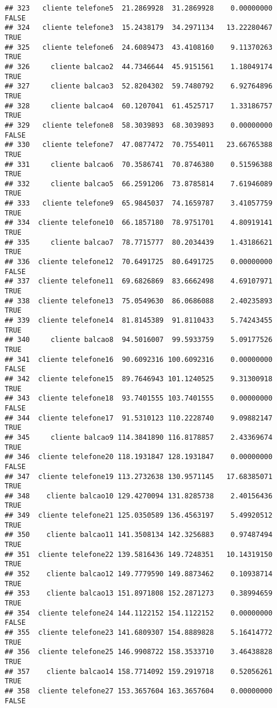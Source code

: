\documentclass[
]{article}
\begin{document}
\begin{verbatim}
## 323   cliente telefone5  21.2869928  31.2869928    0.00000000    FALSE
## 324   cliente telefone3  15.2438179  34.2971134   13.22280467     TRUE
## 325   cliente telefone6  24.6089473  43.4108160    9.11370263     TRUE
## 326     cliente balcao2  44.7346644  45.9151561    1.18049174     TRUE
## 327     cliente balcao3  52.8204302  59.7480792    6.92764896     TRUE
## 328     cliente balcao4  60.1207041  61.4525717    1.33186757     TRUE
## 329   cliente telefone8  58.3039893  68.3039893    0.00000000    FALSE
## 330   cliente telefone7  47.0877472  70.7554011   23.66765388     TRUE
## 331     cliente balcao6  70.3586741  70.8746380    0.51596388     TRUE
## 332     cliente balcao5  66.2591206  73.8785814    7.61946089     TRUE
## 333   cliente telefone9  65.9845037  74.1659787    3.41057759     TRUE
## 334  cliente telefone10  66.1857180  78.9751701    4.80919141     TRUE
## 335     cliente balcao7  78.7715777  80.2034439    1.43186621     TRUE
## 336  cliente telefone12  70.6491725  80.6491725    0.00000000    FALSE
## 337  cliente telefone11  69.6826869  83.6662498    4.69107971     TRUE
## 338  cliente telefone13  75.0549630  86.0686088    2.40235893     TRUE
## 339  cliente telefone14  81.8145389  91.8110433    5.74243455     TRUE
## 340     cliente balcao8  94.5016007  99.5933759    5.09177526     TRUE
## 341  cliente telefone16  90.6092316 100.6092316    0.00000000    FALSE
## 342  cliente telefone15  89.7646943 101.1240525    9.31300918     TRUE
## 343  cliente telefone18  93.7401555 103.7401555    0.00000000    FALSE
## 344  cliente telefone17  91.5310123 110.2228740    9.09882147     TRUE
## 345     cliente balcao9 114.3841890 116.8178857    2.43369674     TRUE
## 346  cliente telefone20 118.1931847 128.1931847    0.00000000    FALSE
## 347  cliente telefone19 113.2732638 130.9571145   17.68385071     TRUE
## 348    cliente balcao10 129.4270094 131.8285738    2.40156436     TRUE
## 349  cliente telefone21 125.0350589 136.4563197    5.49920512     TRUE
## 350    cliente balcao11 141.3508134 142.3256883    0.97487494     TRUE
## 351  cliente telefone22 139.5816436 149.7248351   10.14319150     TRUE
## 352    cliente balcao12 149.7779590 149.8873462    0.10938714     TRUE
## 353    cliente balcao13 151.8971808 152.2871273    0.38994659     TRUE
## 354  cliente telefone24 144.1122152 154.1122152    0.00000000    FALSE
## 355  cliente telefone23 141.6809307 154.8889828    5.16414772     TRUE
## 356  cliente telefone25 146.9908722 158.3533710    3.46438828     TRUE
## 357    cliente balcao14 158.7714092 159.2919718    0.52056261     TRUE
## 358  cliente telefone27 153.3657604 163.3657604    0.00000000    FALSE

\end{verbatim}
\end{document}

